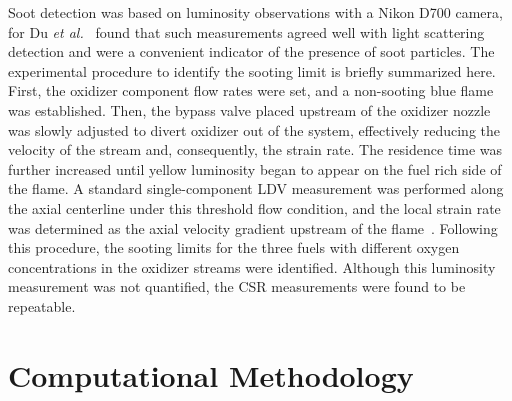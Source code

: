 \begin{table}
  \caption{Oxidizer stream composition in mole fractions to maintain the same adiabatic flame temperature of the three fuels with the same oxygen concentration in the oxidizer stream.}
  \label{table:exp_condition}
  \centering
\end{table}


Soot detection was based on luminosity observations with a Nikon D700 camera, for Du \emph{et al.}~\cite{du89} found that such measurements agreed well with light scattering detection and were a convenient indicator of the presence of soot particles. The experimental procedure to identify the sooting limit is briefly summarized here. First, the oxidizer component flow rates were set, and a non-sooting blue flame was established. Then, the bypass valve placed upstream of the oxidizer nozzle was slowly adjusted to divert oxidizer out of the system, effectively reducing the velocity of the stream and, consequently, the strain rate. The residence time was further increased until yellow luminosity began to appear on the fuel rich side of the flame. A standard single-component LDV measurement was performed along the axial centerline under this threshold flow condition, and the local strain rate was determined as the axial velocity gradient upstream of the flame~\cite{du89}. Following this procedure, the sooting limits for the three fuels with different oxygen concentrations in the oxidizer streams were identified.  Although this luminosity measurement was not quantified, the CSR measurements were found to be repeatable.

\section{Computational Methodology}

